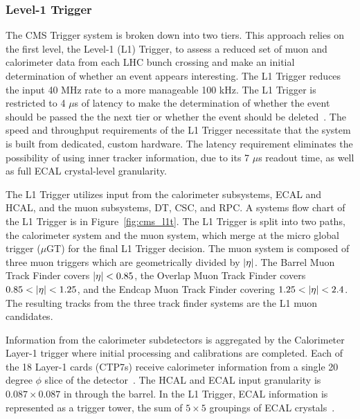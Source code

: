 \subsubsection{Level-1 Trigger}
The CMS Trigger system is broken down into two tiers. This approach relies on
the first level, the Level-1 (L1) Trigger, to assess a reduced set of muon and calorimeter 
data from each LHC
bunch crossing and make an initial determination of whether an event appears interesting.
The L1 Trigger reduces the input 40 MHz rate to a more manageable
100 kHz. The L1 Trigger is restricted to 4 $\mu$s of latency
to make the determination of whether the event should be passed the the next tier or whether
the event should be deleted~\cite{Khachatryan:2016bia}. 
The speed and throughput requirements of the L1 Trigger necessitate that the system 
is built from dedicated, custom hardware. The latency requirement eliminates
the possibility of using inner tracker information, due to its 7 $\mu$s readout time, 
as well as full ECAL crystal-level granularity.

The L1 Trigger utilizes input from the calorimeter subsystems, ECAL and HCAL, and the muon 
subsystems, DT, CSC, and RPC. A systems flow chart of the L1 Trigger is in
Figure~\ref{fig:cms_l1t}. The L1 Trigger is split into two paths, the calorimeter system
and the muon system, which merge at the micro global trigger ($\mu$GT) for the
final L1 Trigger decision. The muon system is composed of three muon triggers which are
geometrically divided by $\lvert\eta\rvert$. The Barrel Muon Track Finder covers $\lvert\eta\rvert < 0.85$,
the Overlap Muon Track Finder covers $0.85 < \lvert\eta\rvert < 1.25$, and the Endcap Muon
Track Finder covering $1.25 < \lvert\eta\rvert < 2.4$. The resulting tracks from the three
track finder systems are the L1 muon candidates.

Information from the calorimeter subdetectors is aggregated by the
Calorimeter Layer-1 trigger where initial processing and calibrations are completed.
Each of the 18 Layer-1 cards (CTP7s) receive calorimeter information from a single 20 degree $\phi$ slice 
of the detector~\cite{Cadamuro:2017slr}. The HCAL and ECAL input granularity is $0.087 \times 0.087$ in \etaphi
through the barrel. 
In the L1 Trigger, 
ECAL information is represented as a trigger tower, the sum of $5 \times 5$ groupings of 
ECAL crystals~\cite{Khachatryan:2016bia}.

